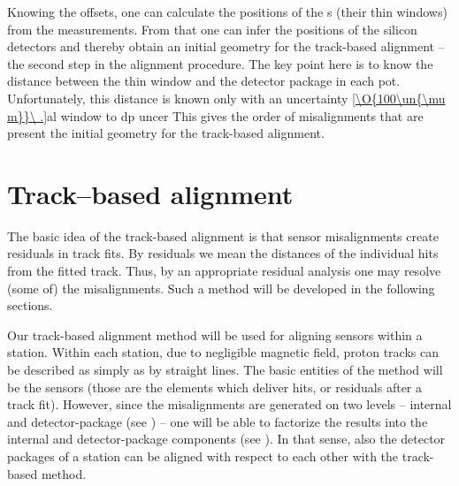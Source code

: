 


Knowing the offsets, one can calculate the positions of the s (their thin windows) from the  measurements. From that one can infer the positions of the silicon detectors and thereby obtain an initial geometry for the track-based alignment -- the second step in the alignment procedure. The key point here is to know the distance between the thin window and the detector package in each pot. Unfortunately, this distance is known only with an uncertainty
\eqref{\O{100\un{\mu m}}\ .}{al window to dp uncer}
This gives the order of misalignments that are present the initial geometry for the track-based alignment.

\section[al tb]{Track--based alignment}

The basic idea of the track-based alignment is that sensor misalignments create residuals in track fits. By residuals we mean the distances of the individual hits from the fitted track. Thus, by an appropriate residual analysis one may resolve (some of) the misalignments. Such a method will be developed in the following sections.

Our track-based alignment method will be used for aligning  sensors within a station. Within each station, due to negligible magnetic field, proton tracks can be described as simply as by straight lines. The basic entities of the method will be the  sensors (those are the  elements which deliver hits, or residuals after a track fit). However, since the misalignments are generated on two levels -- internal and detector-package (see ) -- one will be able to factorize the results into the internal and detector-package components (see ). In that sense, also the detector packages of a station can be aligned with respect to each other with the track-based method.

